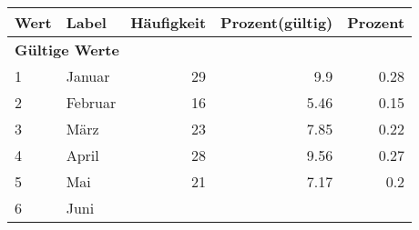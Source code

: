      \begin{longtable}{lXrrr}
     \toprule
     \textbf{Wert} & \textbf{Label} & \textbf{Häufigkeit} & \textbf{Prozent(gültig)} & \textbf{Prozent} \\
     \endhead
     \midrule
     \multicolumn{5}{l}{\textbf{Gültige Werte}}\\

     1 &
     \multicolumn{1}{X}{ Januar   } &


       \num{29} &
       \num[round-mode=places,round-precision=2]{9,9} &
         \num[round-mode=places,round-precision=2]{0,28} \\

     2 &
     \multicolumn{1}{X}{ Februar   } &


       \num{16} &
       \num[round-mode=places,round-precision=2]{5,46} &
         \num[round-mode=places,round-precision=2]{0,15} \\

     3 &
     \multicolumn{1}{X}{ März   } &


       \num{23} &
       \num[round-mode=places,round-precision=2]{7,85} &
         \num[round-mode=places,round-precision=2]{0,22} \\

     4 &
     \multicolumn{1}{X}{ April   } &


       \num{28} &
       \num[round-mode=places,round-precision=2]{9,56} &
         \num[round-mode=places,round-precision=2]{0,27} \\

     5 &
     \multicolumn{1}{X}{ Mai   } &


       \num{21} &
       \num[round-mode=places,round-precision=2]{7,17} &
         \num[round-mode=places,round-precision=2]{0,2} \\

     6 &
     \multicolumn{1}{X}{ Juni   } &



\end{longtable}
